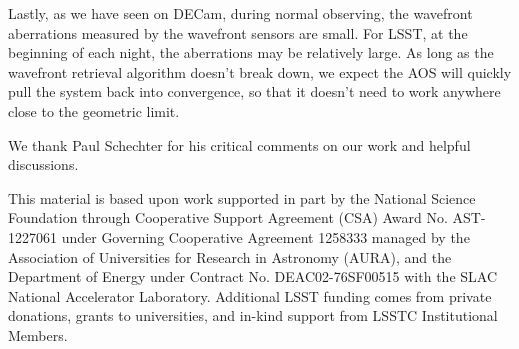 \documentclass[]{spie}  %
\begin{document}
Lastly, as we have seen on DECam, during normal observing, the wavefront aberrations measured by the wavefront sensors are small.
For LSST, at the beginning of each night, the aberrations may be relatively large.
As long as the wavefront retrieval algorithm doesn't break down, we expect the AOS will quickly pull the system back into convergence, so that it doesn't need to work anywhere close to the geometric limit.


\acknowledgments %

We thank Paul Schechter for his critical comments on our work and helpful discussions.
 
This material is based upon work supported in part by the National Science Foundation through Cooperative Support Agreement (CSA) Award No. AST-1227061 under Governing Cooperative Agreement 1258333 managed by the Association of Universities for Research in Astronomy (AURA), and the Department of Energy under Contract No. DEAC02-76SF00515 with the SLAC National Accelerator Laboratory. Additional LSST funding comes from private donations, grants to universities, and in-kind support from LSSTC Institutional Members.

\def\pasp{Publications of the Astronomical Society of the Pacific}%

\end{document}
